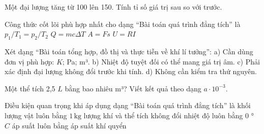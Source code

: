 \begin{ex}
Một đại lượng tăng từ 100 lên 150. Tính tỉ số giá trị sau so với trước.
\end{ex}

\begin{ex}
Công thức cốt lõi phù hợp nhất cho dạng “Bài toán quá trình đẳng tích” là
\choice
{\True $p_1/T_1=p_2/T_2$}
{$Q=mc\Delta T$}
{$A=Fs$}
{$U=RI$}
\end{ex}

\begin{ex}
Xét dạng “Bài toán tổng hợp, đồ thị và thực tiễn về khí lí tưởng”: a) Cần dùng đơn vị phù hợp: $K$; Pa; m³. b) Nhiệt độ tuyệt đối có thể mang giá trị âm. c) Phải xác định đại lượng không đổi trước khi tính. d) Không cần kiểm tra thứ nguyên.
\choiceTF

\end{ex}

\begin{ex}
Một thể tích 2,5 $L$ bằng bao nhiêu m³? Viết kết quả theo dạng $a\cdot10^{-3}$.
\end{ex}

\begin{ex}
Điều kiện quan trọng khi áp dụng dạng “Bài toán quá trình đẳng tích” là
\choice
{khối lượng vật luôn bằng $1\,\text{kg}$}
{\True lượng khí và thể tích không đổi}
{nhiệt độ luôn bằng 0 ° $C$}
{áp suất luôn bằng áp suất khí quyển}
\end{ex}

